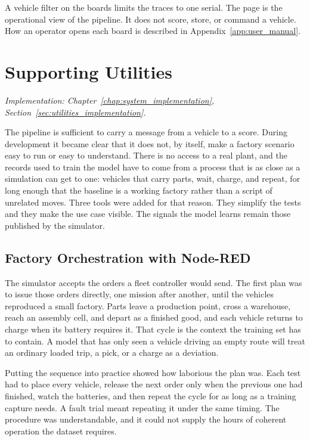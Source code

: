 A vehicle filter on the boards limits the traces to one serial. The page is the operational view of the pipeline. It does not score, store, or command a vehicle. How an operator opens each board is described in Appendix~\ref{app:user_manual}.

\section{Supporting Utilities}
\label{sec:arch_utilities}
\textit{Implementation: Chapter~\ref{chap:system_implementation}, Section~\ref{sec:utilities_implementation}.}

The pipeline is sufficient to carry a message from a vehicle to a score. During development it became clear that it does not, by itself, make a factory scenario easy to run or easy to understand. There is no access to a real plant, and the records used to train the model have to come from a process that is as close as a simulation can get to one: vehicles that carry parts, wait, charge, and repeat, for long enough that the baseline is a working factory rather than a script of unrelated moves. Three tools were added for that reason. They simplify the tests and they make the use case visible. The signals the model learns remain those published by the simulator.

\subsection{Factory Orchestration with Node-RED}
\label{subsec:arch_factory_orchestrator}

The simulator accepts the orders a fleet controller would send. The first plan was to issue those orders directly, one mission after another, until the vehicles reproduced a small factory. Parts leave a production point, cross a warehouse, reach an assembly cell, and depart as a finished good, and each vehicle returns to charge when its battery requires it. That cycle is the context the training set has to contain. A model that has only seen a vehicle driving an empty route will treat an ordinary loaded trip, a pick, or a charge as a deviation.

Putting the sequence into practice showed how laborious the plan was. Each test had to place every vehicle, release the next order only when the previous one had finished, watch the batteries, and then repeat the cycle for as long as a training capture needs. A fault trial meant repeating it under the same timing. The procedure was understandable, and it could not supply the hours of coherent operation the dataset requires.

